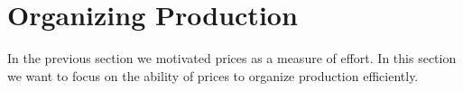 \section{Organizing Production}

In the previous section we motivated prices as a measure of effort. In this
section we want to focus on the ability of prices to organize production
efficiently.




